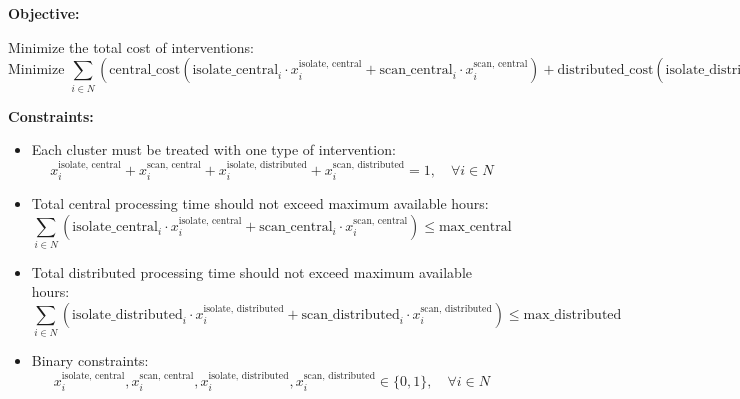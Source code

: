 \documentclass{article}
\begin{document}
\textbf{Objective:}

Minimize the total cost of interventions:
\[
\text{Minimize } \sum_{i \in N} \left( \text{central\_cost} \left( \text{isolate\_central}_i \cdot x_{i}^{\text{isolate, central}} + \text{scan\_central}_i \cdot x_{i}^{\text{scan, central}} \right) + \text{distributed\_cost} \left( \text{isolate\_distributed}_i \cdot x_{i}^{\text{isolate, distributed}} + \text{scan\_distributed}_i \cdot x_{i}^{\text{scan, distributed}} \right) \right)
\]

\textbf{Constraints:}
\begin{itemize}
    \item Each cluster must be treated with one type of intervention:
    \[
    x_{i}^{\text{isolate, central}} + x_{i}^{\text{scan, central}} + x_{i}^{\text{isolate, distributed}} + x_{i}^{\text{scan, distributed}} = 1, \quad \forall i \in N
    \]
    
    \item Total central processing time should not exceed maximum available hours:
    \[
    \sum_{i \in N} \left( \text{isolate\_central}_i \cdot x_{i}^{\text{isolate, central}} + \text{scan\_central}_i \cdot x_{i}^{\text{scan, central}} \right) \leq \text{max\_central}
    \]
    
    \item Total distributed processing time should not exceed maximum available hours:
    \[
    \sum_{i \in N} \left( \text{isolate\_distributed}_i \cdot x_{i}^{\text{isolate, distributed}} + \text{scan\_distributed}_i \cdot x_{i}^{\text{scan, distributed}} \right) \leq \text{max\_distributed}
    \]
    
    \item Binary constraints:
    \[
    x_{i}^{\text{isolate, central}}, x_{i}^{\text{scan, central}}, x_{i}^{\text{isolate, distributed}}, x_{i}^{\text{scan, distributed}} \in \{0,1\}, \quad \forall i \in N
    \]
\end{itemize}
\end{document}
